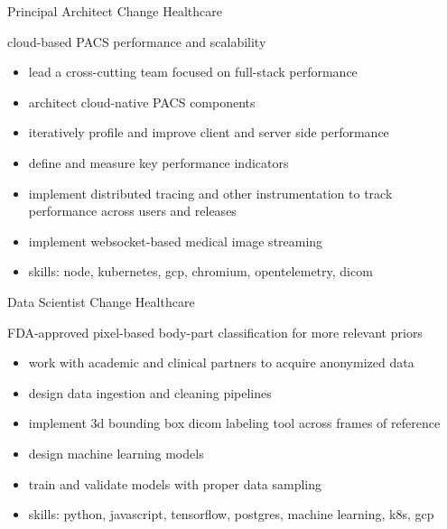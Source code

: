 \documentclass[print]{friggeri-cv}
\begin{document}
\begin{entrylist}
  {Principal Architect} {Change Healthcare}
  {cloud-based PACS performance and scalability
  \begin{itemize}
    \item lead a cross-cutting team focused on full-stack performance
    \item architect cloud-native PACS components
    \item iteratively profile and improve client and server side performance
    \item define and measure key performance indicators
    \item implement distributed tracing and other instrumentation to track \\ performance across users and releases
    \item implement websocket-based medical image streaming
    \item skills: node, kubernetes, gcp, chromium, opentelemetry, dicom
  \end{itemize}}

  {Data Scientist} {Change Healthcare}
  {FDA-approved pixel-based body-part classification for more relevant priors 
  \begin{itemize}
    \item work with academic and clinical partners to acquire anonymized data
    \item design data ingestion and cleaning pipelines
    \item implement 3d bounding box dicom labeling tool across frames of reference
    \item design machine learning models
    \item train and validate models with proper data sampling
    \item skills: python, javascript, tensorflow, postgres, machine learning, k8s, gcp
  \end{itemize}}

\end{entrylist}

\clearpage
\end{document}
